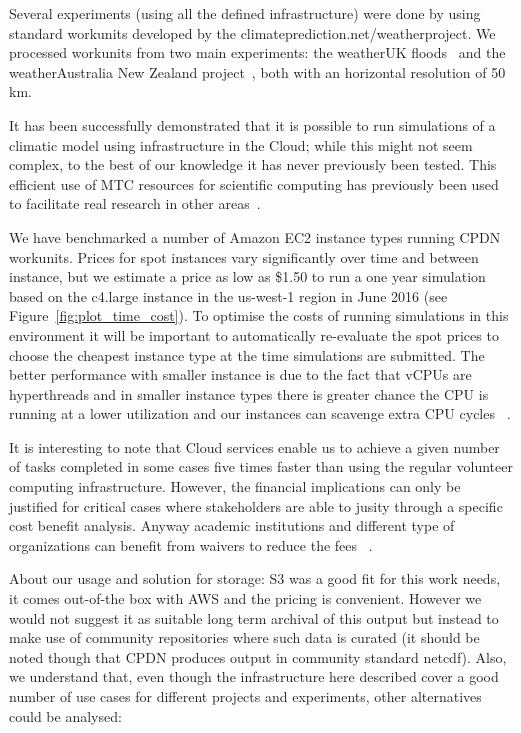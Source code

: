 \documentclass[journal abbreviation, manuscript]{copernicus}
\begin{document}
\begin{conclusions}
Several experiments (using all the defined infrastructure) were done by using standard workunits developed by the climateprediction.net/weather\@home project. We processed workunits from two main experiments: the weather\@home UK floods~\citep{schaller2016} and the weather\@home Australia New Zealand project~\citep{black2016}, both with an horizontal resolution of 50 km.

It has been successfully demonstrated that it is possible to run simulations of a climatic model using infrastructure in the Cloud; while this might not seem complex, to the best of our knowledge it has never previously been tested. This efficient use of MTC resources for scientific computing has previously been used to facilitate real research in other areas~\citep{anel2014, schaller2014}.

We have benchmarked a number of Amazon EC2 instance types running CPDN workunits. Prices for spot instances vary significantly over time and between instance, but we estimate a price as low as \$1.50 to run a one year simulation based on the c4.large instance in the us-west-1 region in June 2016 (see Figure~\ref{fig:plot_time_cost}). To optimise the costs of running simulations in this environment it will be important to automatically re-evaluate the spot prices to choose the cheapest instance type at the time simulations are submitted. The better performance with smaller instance is due to the fact that vCPUs are hyperthreads and in smaller instance types there is greater chance the CPU is running at a lower utilization and our instances can scavenge extra CPU cycles ~\citep{uhe2016}.

It is interesting to note that Cloud services enable us to achieve a given number of tasks completed in some cases five times faster than using the regular volunteer computing infrastructure. However, the financial implications can only be justified for critical cases where stakeholders are able to jusity through a specific cost benefit analysis. Anyway academic institutions and different type of organizations can benefit from waivers to reduce the fees ~\citep{AWSWaiver}.

About our usage and solution for storage: S3 was a good fit for this work needs, it comes out-of-the box with AWS and the pricing is convenient. However we would not suggest it as suitable long term archival of this output but instead to make use of community repositories where such data is curated (it should be noted though that CPDN produces output in community standard netcdf). Also, we understand that, even though the infrastructure here described cover a good number of use cases for different projects and experiments, other alternatives could be analysed:


\end{conclusions}
\end{document}
